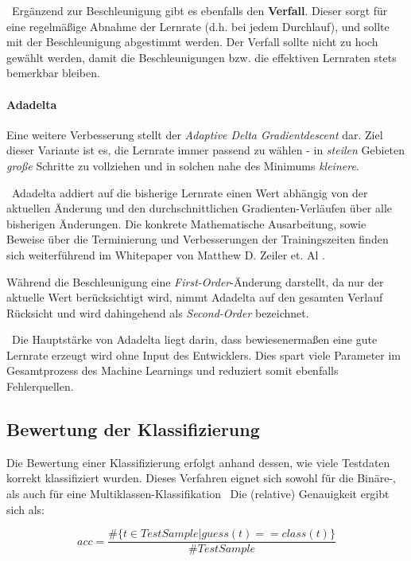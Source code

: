 ~\newline Ergänzend zur Beschleunigung gibt es ebenfalls den \textbf{Verfall}. Dieser sorgt für eine regelmäßige Abnahme der Lernrate (d.h. bei jedem Durchlauf), und sollte mit der Beschleunigung abgestimmt werden. Der Verfall sollte nicht zu hoch gewählt werden, damit die Beschleunigungen bzw. die effektiven Lernraten stets bemerkbar bleiben. 
\paragraph{Adadelta} Eine weitere Verbesserung stellt der \textit{Adaptive Delta Gradientdescent} dar. Ziel dieser Variante ist es, die Lernrate immer passend zu wählen - in \textit{steilen} Gebieten \textit{große} Schritte zu vollziehen und in solchen nahe des Minimums \textit{kleinere}.

~\newline Adadelta addiert auf die bisherige Lernrate einen Wert abhängig von der aktuellen Änderung und den durchschnittlichen Gradienten-Verläufen über alle bisherigen Änderungen. Die konkrete Mathematische Ausarbeitung, sowie Beweise über die Terminierung und Verbesserungen der Trainingszeiten finden sich weiterführend im Whitepaper von Matthew D. Zeiler et. Al \cite{AdaDelta}.

Während die Beschleunigung eine \textit{First-Order}-Änderung darstellt, da nur der aktuelle Wert berücksichtigt wird, nimmt Adadelta auf den gesamten Verlauf Rücksicht und wird dahingehend als \textit{Second-Order} bezeichnet. 

~\newline Die Hauptstärke von Adadelta liegt darin, dass bewiesenermaßen eine gute Lernrate erzeugt wird ohne Input des Entwicklers. Dies spart viele Parameter im Gesamtprozess des Machine Learnings und reduziert somit ebenfalls Fehlerquellen.
\newpage
\subsection{Bewertung der Klassifizierung}
Die Bewertung einer Klassifizierung erfolgt anhand dessen, wie viele Testdaten korrekt klassifiziert wurden. Dieses Verfahren eignet sich sowohl für die Binäre-, als auch für eine Multiklassen-Klassifikation
~\newline Die (relative) Genauigkeit ergibt sich als: 

\begin{equation}
	acc = \dfrac{\#\{t \in  TestSample | guess(t)==class(t)\}}{\#TestSample}
\end{equation}